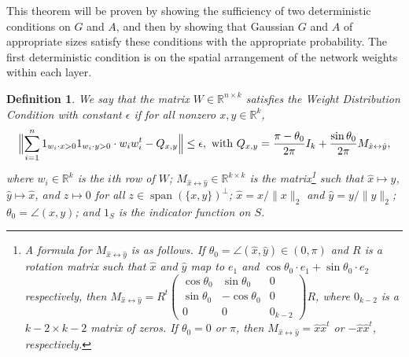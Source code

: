 \documentclass[11pt]{article}
\newtheorem{definition}[theorem]{Definition}
\newcommand{\R}{\mathbb{R}}
\newcommand{\eps}{\epsilon}
\newcommand{\red}[1]{{\color{black} #1}}
\newcommand{\xo}{x_0}
\newcommand{\indwx}{1_{w_i \cdot x > 0}}
\newcommand{\indwy}{1_{w_i \cdot y > 0}}
\newcommand{\Mxyhat}{M_{\hat{x} \leftrightarrow \hat{y}}}
\newcommand{\xhat}{\hat{x}}
\newcommand{\yhat}{\hat{y}}
\newcommand{\Qxy}{Q_{x,y}}
\DeclareMathOperator{\Span}{span}
\begin{document}
This theorem will be proven by showing the sufficiency of two deterministic conditions on $G$ and $A$, and then by showing that Gaussian $G$ and $A$ of appropriate sizes satisfy these conditions with the appropriate probability.
The first deterministic condition is on the spatial arrangement of the network weights within each layer.  
\red{
\begin{definition}
We say that the matrix $W \in \R^{n \times k}$ satisfies the \emph{Weight Distribution Condition} with constant $\eps$ if for all nonzero $x,y \in \R^k$, 
\begin{align}
\Bigl \| \sum_{i=1}^n \indwx \indwy \cdot w_i w_i^t  - \Qxy \Bigr \| \leq \eps,  \text{ with } \Qxy = \frac{\pi - \theta_0}{2 \pi} I_k + \frac{\sin \theta_0}{2\pi}  \Mxyhat, \label{WDC}
\end{align}
where $w_i \in \R^k$ is the $i$th row of $W$; $\Mxyhat \in \R^{k \times k}$ is the matrix\footnote{A formula for $\Mxyhat$ is as follows.  If $\theta_0 = \angle(\xhat, \yhat) \in (0, \pi)$ and $R$ is a rotation matrix such that $\xhat$ and $\yhat$ map to $e_1$ and $\cos \theta_0 \cdot e_1 + \sin \theta_0 \cdot e_2$ respectively, then $\Mxyhat = R^t \begin{pmatrix} \cos \theta_0 & \sin \theta_0 & 0 \\ \sin \theta_0 & - \cos \theta_0 & 0 \\ 0 & 0 & 0_{k-2} \end{pmatrix} R$, where $0_{k-2}$ is a $k-2 \times k-2$ matrix of zeros.  If $\theta_0 = 0$ or $\pi$, then $\Mxyhat = \xhat \xhat^t$ or $- \xhat \xhat^t$, respectively.} such that $\xhat \mapsto \yhat$, $\yhat \mapsto \xhat$, and $z \mapsto 0$ for all $z \in \Span(\{x,y\})^\perp$;  $\xhat = x/\|x\|_2$  and $\yhat = y /\|y\|_2$;  $\theta_0 = \angle(x, y)$; and $1_S$ is the indicator function on $S$. 
\end{definition}
}
\end{document}
